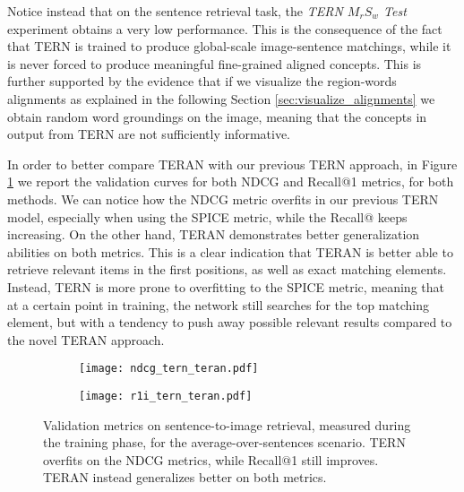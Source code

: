 \documentclass[acmsmall]{acmart}
\newcommand{\majorrevised}[1]{#1}
\begin{document}
Notice instead that on the sentence retrieval task, the \textit{TERN $M_{r}S_{w}$ Test} experiment obtains a very low performance. This is the consequence of the fact that TERN is trained to produce global-scale image-sentence matchings, while it is never forced to produce meaningful fine-grained aligned concepts. This is further supported by the evidence that if we visualize the region-words alignments as explained in the following Section \ref{sec:visualize_alignments} we obtain random word groundings on the image, meaning that the concepts in output from TERN are not sufficiently informative.

\majorrevised{In order to better compare TERAN with our previous TERN approach, in Figure \ref{fig:tern_overfit} we report the validation curves for both NDCG and Recall@1 metrics, for both methods. We can notice how the NDCG metric overfits in our previous TERN model, especially when using the SPICE metric, while the Recall@ keeps increasing. On the other hand, TERAN demonstrates better generalization abilities on both metrics. This is a clear indication that TERAN is better able to retrieve relevant items in the first positions, as well as exact matching elements. Instead, TERN is more prone to overfitting to the SPICE metric, meaning that at a certain point in training, the network still searches for the top matching element, but with a tendency to push away possible relevant results compared to the novel TERAN approach.}

\begin{figure}[t]
\begin{subfigure}[t]{0.49\textwidth}
\centering
\texttt{[image: ndcg\_tern\_teran.pdf]}
\end{subfigure}
\begin{subfigure}[t]{0.473\textwidth}
\centering
\texttt{[image: r1i\_tern\_teran.pdf]}
\end{subfigure}
\caption{\majorrevised{Validation metrics on sentence-to-image retrieval, measured during the training phase, for the average-over-sentences scenario. TERN overfits on the NDCG metrics, while Recall@1 still improves. TERAN instead generalizes better on both metrics.}}
\label{fig:tern_overfit}       \end{figure}
\end{document}
